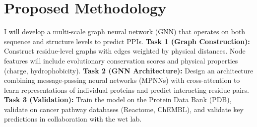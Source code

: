 \section{Proposed Methodology}
I will develop a multi-scale graph neural network (GNN) that operates on both sequence and structure levels to predict PPIs.
\newpar
\textbf{Task 1 (Graph Construction):} Construct residue-level graphs with edges weighted by physical distances. Node features will include evolutionary conservation scores and physical properties (charge, hydrophobicity).
\newpar
\textbf{Task 2 (GNN Architecture):} Design an architecture combining message-passing neural networks (MPNNs) with cross-attention to learn representations of individual proteins and predict interacting residue pairs.
\newpar
\textbf{Task 3 (Validation):} Train the model on the Protein Data Bank (PDB), validate on cancer pathway databases (Reactome, ChEMBL), and validate key predictions in collaboration with the wet lab.
